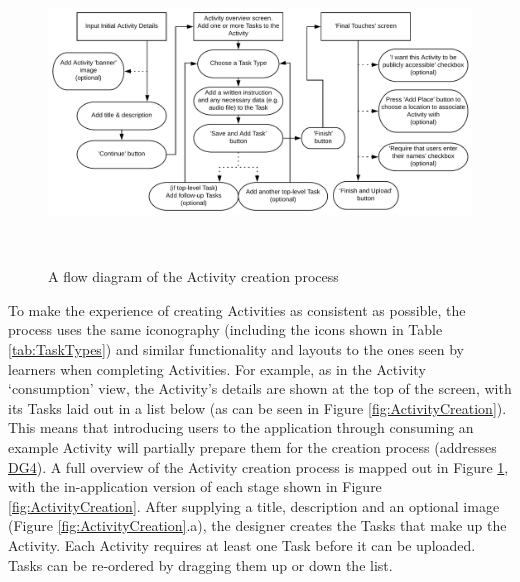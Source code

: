 \begin{figure}
  \centering
  \includegraphics[width=1\columnwidth]{images/chapter05/CreationFlow.png}
  \caption{A flow diagram of the Activity creation process}~\label{fig:CreationFlow}
\end{figure}

To make the experience of creating Activities as consistent as possible, the process uses the same iconography (including the icons shown in Table \ref{tab:TaskTypes}) and similar functionality and layouts to the ones seen by learners when completing Activities. For example, as in the Activity `consumption' view, the Activity's details are shown at the top of the screen, with its Tasks laid out in a list below (as can be seen in Figure \ref{fig:ActivityCreation}). This means that introducing users to the application through consuming an example Activity will partially prepare them for the creation process (addresses \hyperref[DG4]{DG4}). A full overview of the Activity creation process is mapped out in Figure \ref{fig:CreationFlow}, with the in-application version of each stage shown in Figure \ref{fig:ActivityCreation}. After supplying a title, description and an optional image (Figure \ref{fig:ActivityCreation}.a), the designer creates the Tasks that make up the Activity. Each Activity requires at least one Task before it can be uploaded. Tasks can be re-ordered by dragging them up or down the list.

